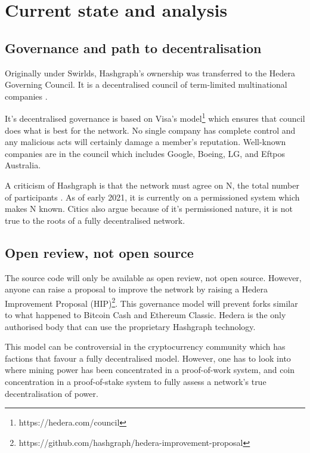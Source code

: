 \section{Current state and analysis}

\subsection{Governance and path to decentralisation}
Originally under Swirlds, Hashgraph's ownership was transferred to the Hedera Governing Council. It is a decentralised council of term-limited multinational companies \cite{baird2018hedera}. 

It's decentralised governance is based on Visa's model\footnote{https://hedera.com/council} which ensures that council does what is best for the network. No single company has complete control and any malicious acts will certainly damage a member's reputation. Well-known companies are in the council which includes Google, Boeing, LG, and Eftpos Australia. 

A criticism of Hashgraph is that the network must agree on N, the total number of participants \cite{kauflin2018}. As of early 2021, it is currently on a permissioned system which makes N known. Citics also argue because of it's permissioned nature, it is not true to the roots of a fully decentralised network.


\subsection{Open review, not open source}
The source code will only be available as open review, not open source. However, anyone can raise a proposal to improve the network by raising a Hedera Improvement Proposal (HIP)\footnote{https://github.com/hashgraph/hedera-improvement-proposal}. This governance model will prevent forks similar to what happened to Bitcoin Cash and Ethereum Classic. Hedera is the only authorised body that can use the proprietary Hashgraph technology.

This model can be controversial in the cryptocurrency community which has factions that favour a fully decentralised model. However, one has to look into where mining power has been concentrated in a proof-of-work system, and coin concentration in a proof-of-stake system to fully assess a network's true decentralisation of power.

